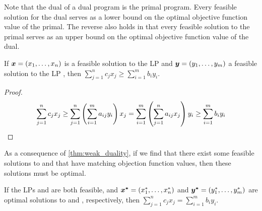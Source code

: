 Note that the dual of a dual program is the primal program. 
Every feasible solution for the dual serves as a lower bound on the optimal objective function 
value of the primal. The reverse also holds in that every feasible solution to the primal 
serves as an upper bound on the optimal objective function value of the dual. 

\begin{theorem}
    If $\bm{x} = \left( x_1, \ldots, x_n \right) $ is a feasible solution to the LP \primal{} and $\bm{y} = \left( y_1, \ldots, y_m \right) $ a feasible solution to the LP \dual{}, 
    then $\sum_{j=1}^{n} c_j x_j \geq \sum_{i=1}^{m} b_i y_i$. 
    \label{thm:weak_duality}
\end{theorem}
\begin{proof}
    \begin{align*}
        \sum_{j=1}^{n} c_j x_j \geq \sum_{j=1}^{n} \left( \sum_{i=1}^{m} a_{ij} y_i \right) x_j
        =  \sum_{i=1}^{m} \left( \sum_{j=1}^{n} a_{ij} x_j \right) y_i 
        \geq \sum_{i=1}^{m} b_i y_i
    \end{align*}
\end{proof}

As a consequence of \cref{thm:weak_duality}, if we find that there exist some 
feasible solutions to \primal{} and \dual{} that have matching objection function values, 
then these solutions must be optimal. 

\begin{theorem}
    If the LPs \primal{} and \dual{} are both feasible, and $\bm{x^{\ast}} = \left( x_1^{\ast}, \ldots, x_n^{\ast} \right)$
    and $\bm{y^{\ast}} = \left( y_1^{\ast}, \ldots, y_m^{\ast} \right)$ are optimal solutions to \primal{} and \dual{}, respectively, 
    then $\sum_{j=1}^{n} c_j x_j = \sum_{i=1}^{m} b_i y_i$. 
    \label{thm:strong_duality}
\end{theorem}

